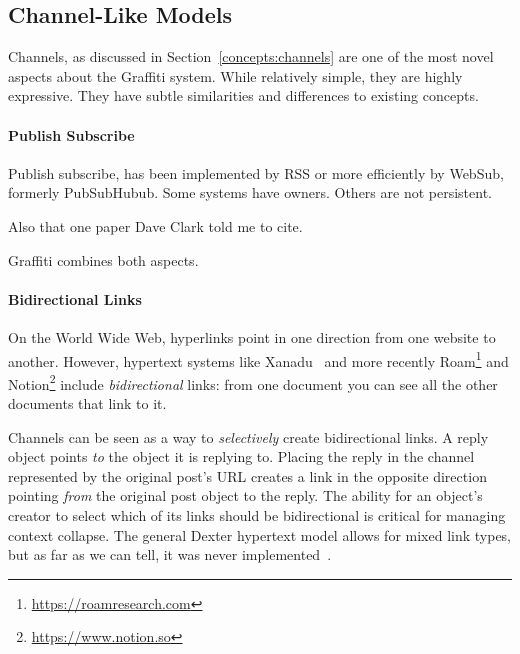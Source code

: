 \subsection{Channel-Like Models}

Channels, as discussed in Section~\ref{concepts:channels}
are one of the most novel aspects about the Graffiti system.
While relatively simple, they are highly expressive.
They have subtle similarities and differences to existing concepts.



\paragraph{Publish Subscribe}

Publish subscribe, has been implemented by RSS or
more efficiently by WebSub, formerly PubSubHubub.
Some systems have owners.
Others are not persistent.

Also that one paper Dave Clark told me to cite.

Graffiti combines both aspects.

\paragraph{Bidirectional Links}

On the World Wide Web, hyperlinks point in one direction from one website to another.
However, hypertext systems like Xanadu~\cite{xanadu}
and more recently Roam\footnote{\url{https://roamresearch.com}}
and Notion\footnote{\url{https://www.notion.so}}
include \emph{bidirectional} links:
from one document you can see all the other documents that link to it.

Channels can be seen as a way to \emph{selectively} create bidirectional links.
A reply object points \emph{to} the object it is replying to.
Placing the reply in the channel represented by the original post's URL
creates a link in the opposite direction
pointing \emph{from} the original post object to the reply.
The ability for an object's creator to select which of its links should be bidirectional
is critical for managing context collapse.
The general Dexter hypertext model allows for mixed link types, but
as far as we can tell, it was never implemented~\cite{dexter}.



